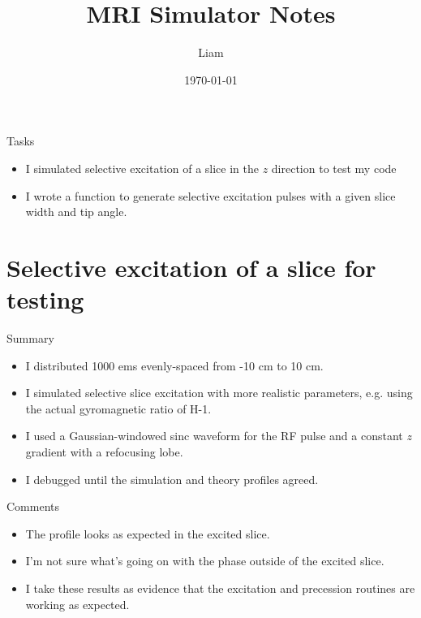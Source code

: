 \documentclass[dvipsnames]{beamer}
\title{MRI Simulator Notes}
\author{Liam}
\date{\today}
\begin{document}
\begin{frame}
\maketitle
\end{frame}

\begin{frame}{Tasks}
\begin{itemize}
\item I simulated selective excitation of a slice in the $z$ direction to test my code
\item I wrote a function to generate selective excitation pulses with a given slice width and tip angle.
\end{itemize}
\end{frame}

\section{Selective excitation of a slice for testing}

\begin{frame}{Summary}
\begin{itemize}
\item I distributed 1000 ems evenly-spaced from -10 cm to 10 cm.
\item I simulated selective slice excitation with more realistic parameters, e.g. using the actual gyromagnetic ratio of H-1.
\item I used a Gaussian-windowed sinc waveform for the RF pulse and a constant $z$ gradient with a refocusing lobe.
\item I debugged until the simulation and theory profiles agreed.
\end{itemize}
\end{frame}

\begin{frame}{Pulse sequence}
\begin{center}
\texttt{[image: \{excitation\_refocus\_pulse]}}
\end{center}
\end{frame}

\begin{frame}{Transverse magnetization profile}
\begin{center}
\texttt{[image: \{excitation\_refocus]}}
\end{center}
\end{frame}

\begin{frame}{Comments}
\begin{itemize}
\item The profile looks as expected in the excited slice.
\item I'm not sure what's going on with the phase outside of the excited slice.
\item I take these results as evidence that the excitation and precession routines are working as expected. 
\end{itemize}
\end{frame}
\end{document}
